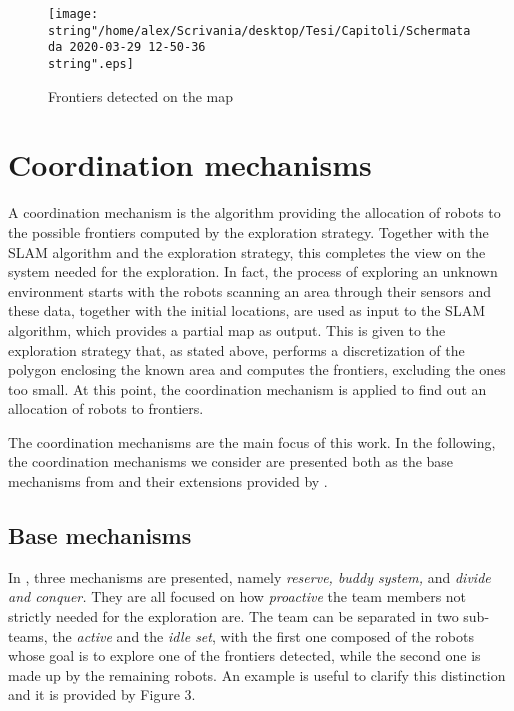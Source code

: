 \begin{figure}
\texttt{[image: \\string"/home/alex/Scrivania/desktop/Tesi/Capitoli/Schermata da 2020-03-29 12-50-36\\string".eps]}

\caption{Frontiers detected on the map}

\end{figure}


\section{Coordination mechanisms}

A coordination mechanism is the algorithm providing the allocation
of robots to the possible frontiers computed by the exploration strategy.
Together with the SLAM algorithm and the exploration strategy, this
completes the view on the system needed for the exploration. In fact,
the process of exploring an unknown environment starts with the robots
scanning an area through their sensors and these data, together with
the initial locations, are used as input to the SLAM algorithm, which
provides a partial map as output. This is given to the exploration
strategy that, as stated above, performs a discretization of the polygon
enclosing the known area and computes the frontiers, excluding the
ones too small. At this point, the coordination mechanism is applied
to find out an allocation of robots to frontiers. 

The coordination mechanisms are the main focus of this work. In the
following, the coordination mechanisms we consider are presented both
as the base mechanisms from \cite{Rogers2013} and their extensions provided
by \cite{Cattaneo2017}.

\subsection{Base mechanisms}

In \cite{Rogers2013}, three mechanisms are presented, namely \emph{reserve,
buddy system, }and \emph{divide and conquer.} They are all focused
on how \emph{proactive }the team members not strictly needed for the
exploration are. The team can be separated in two sub-teams, the \emph{active
}and the \emph{idle set},\emph{ }with the first one composed of the
robots whose goal is to explore one of the frontiers detected, while
the second one is made up by the remaining robots. An example is useful
to clarify this distinction and it is provided by Figure 3. 

